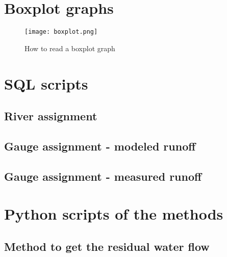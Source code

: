 \appendix
\chapter{Boxplot graphs}
\label{app:boxplot}

\begin{figure}[H]
\centering
\texttt{[image: boxplot.png]}
\caption[How to read a boxplot graph]{How to read a boxplot graph \cite{stk_boxplot}}
\label{boxlot}
\end{figure}

\chapter{SQL scripts}
\section{River assignment}
\label{app:sql_assign_river}




\section{Gauge assignment - modeled runoff}
\label{app:sql_assign_watergap}




\section{Gauge assignment - measured runoff}
\label{app:sql_assign_gauge}



\chapter{Python scripts of the methods}
\section{Method to get the residual water flow}
\label{app:get_dV_res}



